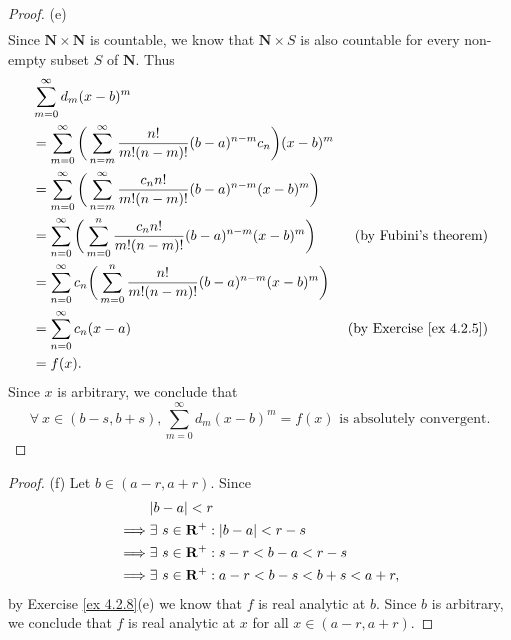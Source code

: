 \begin{proof}{(e)}
\begin{align*}
    \end{align*}
    Since \(\mathbf{N} \times \mathbf{N}\) is countable, we know that \(\mathbf{N} \times S\) is also countable for every non-empty subset \(S\) of \(\mathbf{N}\).
    Thus
    \begin{align*}
         & \sum_{m = 0}^\infty d_m (x - b)^m                                                                                                                \\
         & = \sum_{m = 0}^\infty \bigg(\sum_{n = m}^\infty \frac{n!}{m! (n - m)!} (b - a)^{n - m} c_n\bigg) (x - b)^m                                       \\
         & = \sum_{m = 0}^\infty \bigg(\sum_{n = m}^\infty \frac{c_n n!}{m! (n - m)!} (b - a)^{n - m} (x - b)^m\bigg)                                       \\
         & = \sum_{n = 0}^\infty \bigg(\sum_{m = 0}^n \frac{c_n n!}{m! (n - m)!} (b - a)^{n - m} (x - b)^m\bigg)      & \text{(by Fubini's theorem)}        \\
         & = \sum_{n = 0}^\infty c_n \bigg(\sum_{m = 0}^n \frac{n!}{m! (n - m)!} (b - a)^{n - m} (x - b)^m\bigg)                                            \\
         & = \sum_{n = 0}^\infty c_n (x - a)                                                                          & \text{(by Exercise \ref{ex 4.2.5})} \\
         & = f(x).
    \end{align*}
    Since \(x\) is arbitrary, we conclude that
    \[
        \forall\ x \in (b - s, b + s), \sum_{m = 0}^\infty d_m (x - b)^m = f(x) \text{ is absolutely convergent}.
    \]
\end{proof}

\begin{proof}{(f)}
    Let \(b \in (a - r, a + r)\).
    Since
    \begin{align*}
                 & \abs*{b - a} < r                                             \\
        \implies & \exists\ s \in \mathbf{R}^+ : \abs*{b - a} < r - s           \\
        \implies & \exists\ s \in \mathbf{R}^+ : s - r < b - a < r - s          \\
        \implies & \exists\ s \in \mathbf{R}^+ : a - r < b - s < b + s < a + r,
    \end{align*}
    by Exercise \ref{ex 4.2.8}(e) we know that \(f\) is real analytic at \(b\).
    Since \(b\) is arbitrary, we conclude that \(f\) is real analytic at \(x\) for all \(x \in (a - r, a + r)\).
\end{proof}